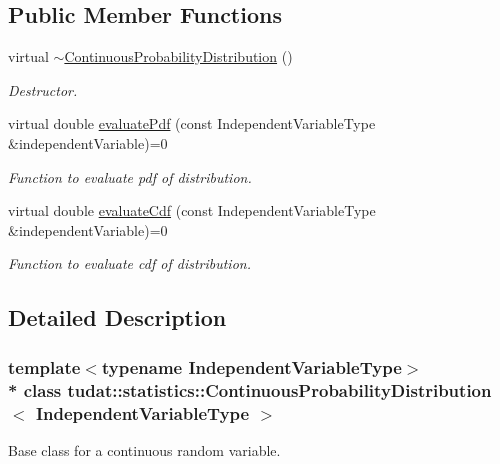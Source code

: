 \subsection*{Public Member Functions}
\begin{DoxyCompactItemize}
\item 
virtual \hyperlink{classtudat_1_1statistics_1_1ContinuousProbabilityDistribution_a621a691342d27745eb2e9f617372e075}{$\sim$\+Continuous\+Probability\+Distribution} ()\hypertarget{classtudat_1_1statistics_1_1ContinuousProbabilityDistribution_a621a691342d27745eb2e9f617372e075}{}\label{classtudat_1_1statistics_1_1ContinuousProbabilityDistribution_a621a691342d27745eb2e9f617372e075}

\begin{DoxyCompactList}\small\item\em Destructor. \end{DoxyCompactList}\item 
virtual double \hyperlink{classtudat_1_1statistics_1_1ContinuousProbabilityDistribution_a7edfe6753ce63fe4e12409d3fb88e499}{evaluate\+Pdf} (const Independent\+Variable\+Type \&independent\+Variable)=0
\begin{DoxyCompactList}\small\item\em Function to evaluate pdf of distribution. \end{DoxyCompactList}\item 
virtual double \hyperlink{classtudat_1_1statistics_1_1ContinuousProbabilityDistribution_ad60887b5623ded9e73456dedcbf32a8a}{evaluate\+Cdf} (const Independent\+Variable\+Type \&independent\+Variable)=0
\begin{DoxyCompactList}\small\item\em Function to evaluate cdf of distribution. \end{DoxyCompactList}\end{DoxyCompactItemize}


\subsection{Detailed Description}
\subsubsection*{template$<$typename Independent\+Variable\+Type$>$\\*
class tudat\+::statistics\+::\+Continuous\+Probability\+Distribution$<$ Independent\+Variable\+Type $>$}

Base class for a continuous random variable. 

